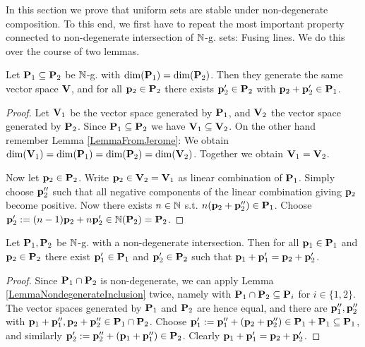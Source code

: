 In this section we prove that uniform sets are stable under non-degenerate composition. To this end, we first have to repeat the most important property connected to non-degenerate intersection of \(\mathbb{N}\)-g. sets: Fusing lines. We do this over the course of two lemmas.

\begin{lemma}
Let \(\mathbf{P}_1 \subseteq \mathbf{P}_2\) be \(\mathbb{N}\)-g. with \(\dim(\mathbf{P}_1)=\dim(\mathbf{P}_2)\). Then they generate the same vector space \(\mathbf{V}\), and for all \(\mathbf{p}_2 \in \mathbf{P}_2\) there exists \(\mathbf{p}_2' \in \mathbf{P}_2\) with \(\mathbf{p}_2+\mathbf{p}_2' \in \mathbf{P}_1\). \label{LemmaNondegenerateInclusion}
\end{lemma}

\begin{proof}
Let \(\mathbf{V}_1\) be the vector space generated by \(\mathbf{P}_1\), and \(\mathbf{V}_2\) the vector space generated by \(\mathbf{P}_2\). Since \(\mathbf{P}_1 \subseteq \mathbf{P}_2\) we have \(\mathbf{V}_1 \subseteq \mathbf{V}_2\). On the other hand remember Lemma \ref{LemmaFromJerome}: We obtain \(\dim(\mathbf{V}_1)=\dim(\mathbf{P}_1)= \dim(\mathbf{P}_2)=\dim(\mathbf{V}_2)\). Together we obtain \(\mathbf{V}_1=\mathbf{V}_2\).

Now let \(\mathbf{p}_2\in \mathbf{P}_2\). Write \(\mathbf{p}_2 \in \mathbf{V}_2=\mathbf{V}_1\) as linear combination of \(\mathbf{P}_1\). Simply choose \(\mathbf{p}_2''\) such that all negative components of the linear combination giving \(\mathbf{p}_2\) become positive. Now there exists \(n \in \mathbb{N}\) s.t. \(n(\mathbf{p}_2+\mathbf{p}_2'') \in \mathbf{P}_1\). Choose \(\mathbf{p}_2':=(n-1) \mathbf{p}_2 + n \mathbf{p}_2' \in \mathbb{N}(\mathbf{P}_2)=\mathbf{P}_2\).
\end{proof}

\begin{lemma}
Let \(\mathbf{P}_1, \mathbf{P}_2\) be \(\mathbb{N}\)-g. with a non-degenerate intersection. Then for all \(\mathbf{p}_1 \in \mathbf{P}_1\) and \(\mathbf{p}_2 \in \mathbf{P}_2\) there exist \(\mathbf{p}_1' \in \mathbf{P}_1\) and \(\mathbf{p}_2' \in \mathbf{P}_2\) such that \(\mathbf{p}_1+\mathbf{p}_1'=\mathbf{p}_2+\mathbf{p}_2'\). \label{LemmaNonDegenerateCombineVectors}
\end{lemma}

\begin{proof}
Since \(\mathbf{P}_1 \cap \mathbf{P}_2\) is non-degenerate, we can apply Lemma \ref{LemmaNondegenerateInclusion} twice, namely with \(\mathbf{P}_1 \cap \mathbf{P}_2 \subseteq \mathbf{P}_i\) for \(i\in \{1,2\}\). The vector spaces generated by \(\mathbf{P}_1\) and \(\mathbf{P}_2\) are hence equal, and there are \(\mathbf{p}_1'', \mathbf{p}_2''\) with \(\mathbf{p}_1+\mathbf{p}_1'', \mathbf{p}_2+\mathbf{p}_2'' \in \mathbf{P}_1 \cap \mathbf{P}_2\). Choose \(\mathbf{p}_1':=\mathbf{p}_1''+(\mathbf{p}_2+\mathbf{p}_2'') \in \mathbf{P}_1+\mathbf{P}_1 \subseteq \mathbf{P}_1\), and similarly \(\mathbf{p}_2':=\mathbf{p}_2''+(\mathbf{p}_1+\mathbf{p}_1'') \in \mathbf{P}_2\). Clearly \(\mathbf{p}_1+\mathbf{p}_1'=\mathbf{p}_2+\mathbf{p}_2'\).
\end{proof}

